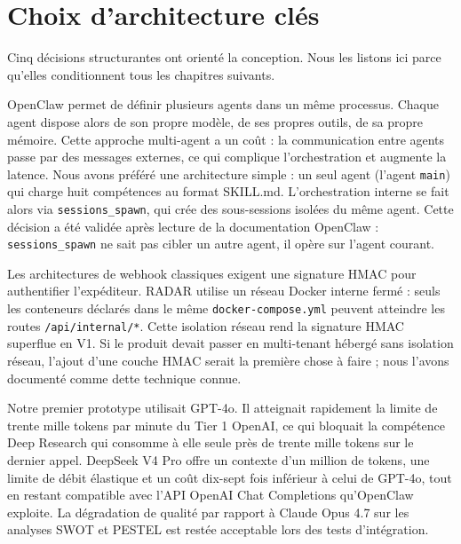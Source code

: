 \documentclass[12pt,a4paper,openany]{report}
\begin{document}
\section{Choix d'architecture clés}
\label{sec:choix-architecture}

Cinq décisions structurantes ont orienté la conception. Nous les listons ici parce qu'elles conditionnent tous les chapitres suivants.

\begin{decisionBox}[title={Décision 1 : un seul agent OpenClaw avec huit compétences, et non huit agents distincts}]
OpenClaw permet de définir plusieurs agents dans un même processus. Chaque agent dispose alors de son propre modèle, de ses propres outils, de sa propre mémoire. Cette approche multi-agent a un coût : la communication entre agents passe par des messages externes, ce qui complique l'orchestration et augmente la latence. Nous avons préféré une architecture simple : un seul agent (l'agent \texttt{main}) qui charge huit compétences au format SKILL.md. L'orchestration interne se fait alors via \texttt{sessions\_spawn}, qui crée des sous-sessions isolées du même agent. Cette décision a été validée après lecture de la documentation OpenClaw : \texttt{sessions\_spawn} ne sait pas cibler un autre agent, il opère sur l'agent courant.
\end{decisionBox}

\begin{decisionBox}[title={Décision 2 : communication agent vers web via HTTP interne, sans signature HMAC}]
Les architectures de webhook classiques exigent une signature HMAC pour authentifier l'expéditeur. RADAR utilise un réseau Docker interne fermé : seuls les conteneurs déclarés dans le même \texttt{docker-compose.yml} peuvent atteindre les routes \texttt{/api/internal/*}. Cette isolation réseau rend la signature HMAC superflue en V1. Si le produit devait passer en multi-tenant hébergé sans isolation réseau, l'ajout d'une couche HMAC serait la première chose à faire ; nous l'avons documenté comme dette technique connue.
\end{decisionBox}

\begin{decisionBox}[title={Décision 3 : modèle LLM DeepSeek V4 Pro, et non GPT-4o ni Claude Opus}]
Notre premier prototype utilisait GPT-4o. Il atteignait rapidement la limite de trente mille tokens par minute du Tier 1 OpenAI, ce qui bloquait la compétence Deep Research qui consomme à elle seule près de trente mille tokens sur le dernier appel. DeepSeek V4 Pro offre un contexte d'un million de tokens, une limite de débit élastique et un coût dix-sept fois inférieur à celui de GPT-4o, tout en restant compatible avec l'API OpenAI Chat Completions qu'OpenClaw exploite. La dégradation de qualité par rapport à Claude Opus 4.7 sur les analyses SWOT et PESTEL est restée acceptable lors des tests d'intégration.
\end{decisionBox}
\end{document}
